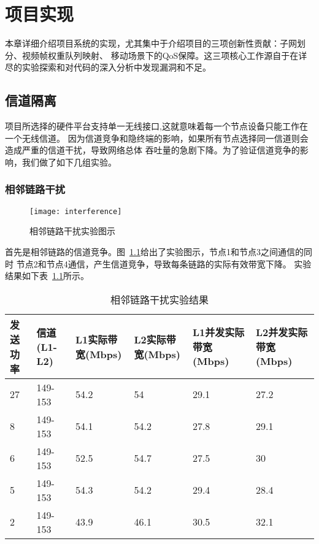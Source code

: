 \chapter{项目实现}
\label{cha:china}
本章详细介绍项目系统的实现，尤其集中于介绍项目的三项创新性贡献：子网划分、视频帧权重队列映射、
移动场景下的QoS保障。这三项核心工作源自于在详尽的实验探索和对代码的深入分析中发现漏洞和不足。

\section{信道隔离}
项目所选择的硬件平台支持单一无线接口,这就意味着每一个节点设备只能工作在一个无线信道。
因为信道竞争和隐终端的影响，如果所有节点选择同一信道则会造成严重的信道干扰，导致网络总体
吞吐量的急剧下降。为了验证信道竞争的影响，我们做了如下几组实验。

\subsection{相邻链路干扰}
\begin{figure}[H] %
  \centering
  \texttt{[image: interference]}
  \caption{相邻链路干扰实验图示}
  \label{fig:interference}
\end{figure}

首先是相邻链路的信道竞争。图~\ref{fig:interference}给出了实验图示，节点1和节点3之间通信的同时
节点2和节点4通信，产生信道竞争，导致每条链路的实际有效带宽下降。
实验结果如下表~\ref{tab:interference}所示。

\begin{table}[htbp]
  \centering
  \caption{相邻链路干扰实验结果}
  \label{tab:interference}
  \begin{tabular}{p{2cm}p{2cm}p{2cm}p{2cm}p{2cm}p{2cm}}
  \hline
  发送功率 & 信道(L1-L2) & L1实际带宽(Mbps) & L2实际带宽(Mbps) & L1并发实际带宽(Mbps) & L2并发实际带宽(Mbps) \\
  \hline
  27 &  149-153 & 54.2 & 54 & 29.1 & 27.2 \\
  8 &  149-153 & 54.1 & 54.2 & 27.8 & 29.1 \\
  6 &  149-153 & 52.5 & 54.7 & 27.5 & 30 \\
  5 &  149-153 & 54.3 & 54.2 & 29.4 & 28.4 \\
  2 &  149-153 & 43.9 & 46.1 & 30.5 & 32.1 \\
  \hline
  \end{tabular}
\end{table}

